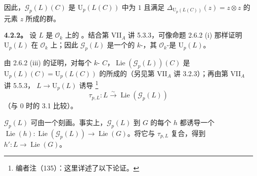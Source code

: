 因此，$\mathscr G_p(L)(C)$ 是 $\mathrm U_p(L(C))$ 中为 $1$ 且满足 $\Delta_{\mathrm U_p(L(C))}(z)=z\otimes z$ 的元素 $z$ 所成的群。

\textbf{4.2.2。} 设 $L$ 是 $\mathcal O_k$ 上的 。结合第 VII$_A$ 讲 5.3.3，可像命题 2.6.2 (i) 那样证明 $\mathrm U_p(L)$ 在 $\mathcal O_k$ 上；因此 $\mathscr G_p(L)$ 是一个的 $k$-，其 $\mathcal O_k$-是 $\mathrm U_p(L)$。

由 2.6.2 (iii) 的证明，对每个 $k$- $C$，$\operatorname{Lie}(\mathscr G_p(L))(C)$ 是 $\mathrm U_p(L)(C)=\mathrm U_p(L(C))$ 的所成的（另见第 VII$_A$ 讲 3.2.3）；再由第 VII$_A$ 讲 5.5.3， $L\to\mathrm U_p(L)$ 诱导 \footnote{编者注（135）：这里详述了以下论证。}
\[
\tau_{p,L}:L\xrightarrow{\sim}\operatorname{Lie}(\mathscr G_p(L))
\]
（与 $0$ 时的 3.1 比较）。

 $\mathscr G_p(L)$ 可由一个刻画。事实上，$\mathscr G_p(L)$ 到 $G$ 的每个 $h$ 都诱导一个 $\operatorname{Lie}(h):\operatorname{Lie}(\mathscr G_p(L))\to\operatorname{Lie}(G)$。将它与 $\tau_{p,L}$ 复合，得到 $h':L\to\operatorname{Lie}(G)$。

